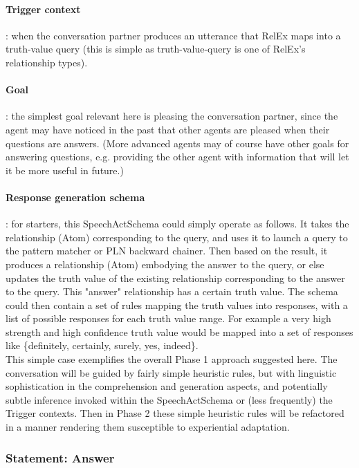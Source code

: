 \documentclass[10pt]{article}
\begin{document}
\paragraph{Trigger context}: when the conversation partner produces an utterance that RelEx maps into a truth-value query (this is simple as truth-value-query is one of RelEx's relationship types).

\paragraph{Goal}: the simplest goal relevant here is pleasing the conversation partner, since the agent may have noticed in the past that other agents are pleased when their questions are answers.  (More advanced agents may of course have other goals for answering questions, e.g. providing the other agent with information that will let it be more useful in future.)

\paragraph{Response generation schema}: for starters, this SpeechActSchema could simply operate as follows.  It takes the relationship (Atom) corresponding to the query, and uses it to launch a query to the pattern matcher or PLN backward chainer.   Then based on the result, it produces a relationship (Atom) embodying the answer to the query, or else updates the truth value of the existing relationship corresponding to the answer to the query.  This "answer" relationship has a certain truth value.  The schema could then contain a set of rules mapping the truth values into responses, with a list of possible responses for each truth value range.  For example a very high strength and high confidence truth value would be mapped into a set of responses like \{definitely, certainly, surely, yes, indeed\}.
  \\

This simple case exemplifies the overall Phase 1 approach suggested here.  The conversation will be guided by fairly simple heuristic rules, but with linguistic sophistication in the comprehension and generation aspects, and potentially subtle inference invoked within the SpeechActSchema or (less frequently) the Trigger contexts.  Then in Phase 2 these simple heuristic rules will be refactored in a manner rendering them susceptible to experiential adaptation.

\subsubsection{Statement: Answer}
\end{document}
